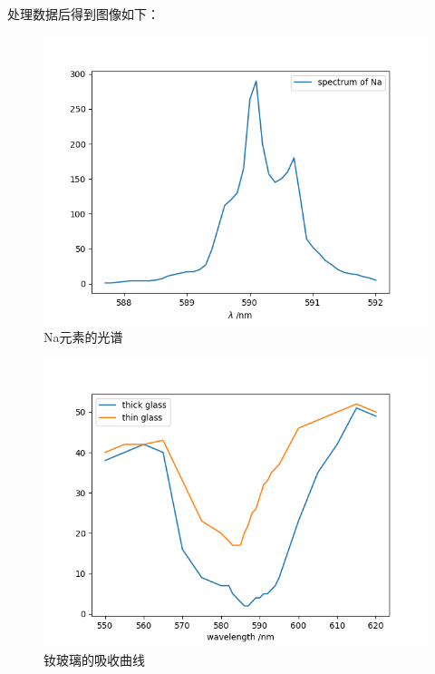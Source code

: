 \documentclass{buaaemp}
\begin{document}
处理数据后得到图像如下：
\begin{figure}
    \centering
    \includegraphics[width=\linewidth]{image/spectrum.png}
    \caption{Na元素的光谱}
    \label{fig:my_label2}
\end{figure}
\begin{figure}
    \centering
    \includegraphics[width=\linewidth]{image/absorption.png}
    \caption{钕玻璃的吸收曲线}
    \label{fig:my_label3}
\end{figure}
\end{document}

